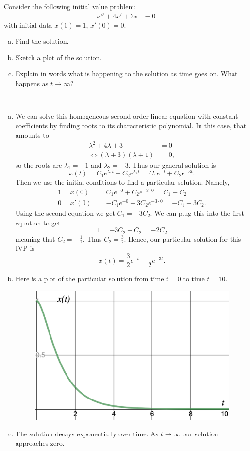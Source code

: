 \documentclass[12pt]{article} %
\begin{document}
\newpage
\begin{problem}
Consider the following initial value problem:
\begin{align*}
    x''+4x'+3x&=0
\end{align*}
with initial data $x(0)=1$, $x'(0)=0$.  
\begin{enumerate}[(a)]
    \item Find the solution.
    \item Sketch a plot of the solution.
    \item Explain in words what is happening to the solution as time goes on. What happens as $t\to \infty$?
\end{enumerate}
\end{problem}
\begin{solution}~
\begin{enumerate}[(a)]
    \item We can solve this homogeneous second order linear equation with constant coefficients by finding roots to its characteristic polynomial. In this case, that amounts to
    \begin{align*}
        \lambda^2+4\lambda+3&=0\\
        \iff (\lambda +3)(\lambda+1)&=0,
    \end{align*}
    so the roots are $\lambda_1=-1$ and $\lambda_2=-3$.  Thus our general solution is
    \[
    x(t)=C_1 e^{\lambda_1 t}+C_2e^{\lambda_2 t}=C_1 e^{-t}+C_2e^{-3t}.
    \]
    Then we use the initial conditions to find a particular solution. Namely,
    \begin{align*}
        1=x(0)&=C_1e^{-0}+C_2e^{-3\cdot 0}=C_1+C_2\\
        0=x'(0)&=-C_1e^{-0}-3C_2e^{-3\cdot 0}=-C_1-3C_2.
    \end{align*}
    Using the second equation we get $C_1=-3C_2$. We can plug this into the first equation to get
    \[
    1=-3C_2+C_2=-2C_2
    \]
    meaning that $C_2=-\frac{1}{2}$. Thus $C_2=\frac{3}{2}$. Hence, our particular solution for this IVP is
    \[
    x(t)=\frac{3}{2} e^{-t}-\frac{1}{2}e^{-3t}.
    \]
    \item Here is a plot of the particular solution from time $t=0$ to time $t=10$.
    \begin{figure}[H]
        \centering
        \includegraphics[width=.7\textwidth]{desmos-graph(19).png}
    \end{figure}
    \item The solution decays exponentially over time.  As $t\to \infty$ our solution approaches zero.
\end{enumerate}
\end{solution}
\end{document}
